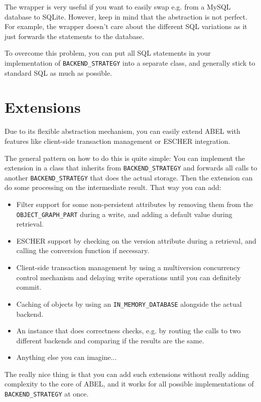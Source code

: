 The wrapper is very useful if you want to easily swap e.g. from a MySQL database to SQLite.
However, keep in mind that the abstraction is not perfect. 
For example, the wrapper doesn't care about the different SQL variations as it just forwards the statements to the database.

To overcome this problem, you can put all SQL statements in your implementation of \lstinline!BACKEND_STRATEGY! into a separate class, and generally stick to standard SQL as much as possible.


\section{Extensions}

Due to its flexible abstraction mechanism, you can easily extend ABEL with features like client-side transaction management or ESCHER \cite {escher} integration.

The general pattern on how to do this is quite simple: 
You can implement the extension in a class that inherits from \lstinline!BACKEND_STRATEGY! and forwards all calls to another \lstinline!BACKEND_STRATEGY! that does the actual storage.
Then the extension can do some processing on the intermediate result.
That way you can add:

\begin{itemize}
 \item Filter support for some non-persistent attributes by removing them from the \lstinline!OBJECT_GRAPH_PART! during a write, and adding a default value during retrieval.
 \item ESCHER support by checking on the version attribute during a retrieval, and calling the conversion function if necessary.
 \item Client-side transaction management by using a multiversion concurrency control mechanism and delaying write operations until you can definitely commit.
 \item Caching of objects by using an \lstinline!IN_MEMORY_DATABASE! alongside the actual backend.
 \item An instance that does correctness checks, e.g. by routing the calls to two different backends and comparing if the results are the same.
 \item Anything else you can imagine...
\end{itemize}

The really nice thing is that you can add such extensions without really adding complexity to the core of ABEL, and it works for all possible implementations of \lstinline!BACKEND_STRATEGY! at once.


